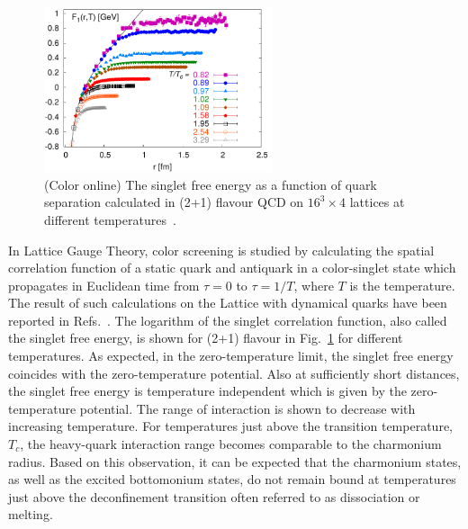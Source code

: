 \begin{figure}[h]
   \begin{center}
      \includegraphics[width=0.6\textwidth]{Figures/Fig16_LattSingEnergy.png}
      \caption{(Color online) The singlet free energy as a function of quark separation 
        calculated in (2+1) flavour QCD on $16^3 \times 4$ lattices at different 
             temperatures~\cite{Petreczky:2009ip,Petreczky:2010yn}.  
      }
      \label{Fig:LatticeSingEner}
   \end{center}
\end{figure}
In Lattice Gauge Theory, color screening is studied  by 
calculating the spatial correlation function of a static quark and
antiquark in a color-singlet state which propagates in Euclidean time 
from $\tau=0$ to $\tau=1/T$, where $T$ is the temperature.
The result of such calculations on the Lattice  with dynamical quarks have been
reported in Refs.~\cite{Petreczky:2009ip,Petreczky:2010yn,Kaczmarek:2002mc}.
The logarithm of the singlet correlation function, also called the singlet free energy,
is shown for (2+1) flavour in Fig.~\ref{Fig:LatticeSingEner} for
different temperatures.
As expected, in the zero-temperature limit,
the singlet free energy coincides with the zero-temperature potential. 
Also at sufficiently short distances, the singlet free energy is
temperature independent which is given by the zero-temperature potential. 
The range of interaction is shown to decrease with increasing temperature.
For temperatures just above the transition temperature, $T_c$, the heavy-quark 
interaction range becomes comparable to the charmonium radius. Based on 
this observation, it can be expected that the charmonium
states, as well as the excited bottomonium states, do not remain bound at
temperatures just above the deconfinement transition often referred to as 
dissociation or melting. 

